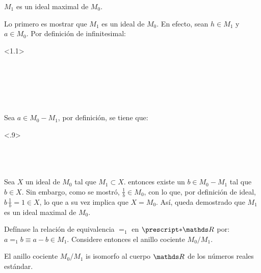 \begin{lemma}
  $M_1$ es un ideal maximal de $M_0$.
\end{lemma}
\begin{demo}
  Lo primero es mostrar que $M_1$ es un ideal de $M_0$. En efecto, sean
  $h\in M_1$ y $a\in M_0$. Por definición de infinitesimal:
  \begin{longderivation}<1.1>
      \\
    \equiv\\
      \\
    \\
      \\
    \equiv\\
  \end{longderivation}
  Sea $a\in M_0 - M_1$, por definición, se tiene que:
  \begin{longderivation}<.9>
      \\
    \equiv\\
      \\
    \equiv\\
  \end{longderivation}
  Sea $X$ un ideal de $M_0$ tal que $M_1\subset X$. entonces existe un
  $b\in M_0 - M_1$ tal que $b\in X$. Sin embargo, como se mostró,
  $\frac{1}{b}\in M_0$, con lo que, por definición de ideal,
  $b\,\frac{1}{b}=1\in X$, lo que a su vez implica que $X=M_0$. Así,
  queda demostrado que $M_1$ es un ideal maximal de $M_0$.
\end{demo}

Defínase la relación de equivalencia $=_1$ en $\st{\R}$ por:
$a=_1 b \equiv a - b \in M_1$. Considere entonces el anillo cociente
$M_0/M_1$.

\begin{theorem}
  El anillo cociente $M_0/M_1$ is isomorfo al cuerpo $\R$ de los números
  reales estándar.
\end{theorem}


